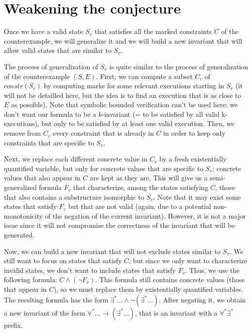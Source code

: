 \documentclass[11pt,a4paper,oldfontcommands,openany]{memoir}
\begin{document}
    \section{Weakening the conjecture}

    Once we have a valid state \(S_v\) that satisfies all the marked constraints \(C\) of the counterexample,
    we will generalize it and we will build a new invariant that will allow valid states that are similar to \(S_v\).

    The process of generalization of \(S_v\) is quite similar to the process of generalization of the counterexample \((S,E)\).
    First, we can compute a subset \(C_v\) of \(constr(S_v)\) by computing marks for some relevant executions starting in \(S_v\)
    (it will not be detailled here, but the idea is to find an execution that is as close to \(E\) as possible).
    Note that symbolic bounded verification can't be used here: we don't want our formula to be a \(k\)-invariant (= to be satisfied by all valid k-executions),
    but only to be satisfied by at least one valid execution.
    Then, we remove from \(C_v\) every constraint that is already in \(C\) in order to keep only constraints that are specific to \(S_v\).

    Next, we replace each different concrete value in \(C_v\) by a fresh existentially quantified variable, but only for concrete values that are specific to \(S_v\):
    concrete values that also appear in \(C\) are kept as they are.
    This will give us a semi-generalized formula \(F_v\) that characterize, among the states satisfying \(C\), those that also
    contains a substructure isomorphic to \(S_v\). Note that it may exist some states that satisfy \(F_v\) but that are not
    valid (again, due to a potential non-monotonicity of the negation of the current invariant).
    However, it is not a major issue since it will not compromise the correctness of the invariant that will be generated.

    Now, we can build a new invariant that will not exclude states similar to \(S_v\).
    We still want to focus on states that satisfy \(C\), but since we only want to characterize invalid states, we don't want to include states that satisfy \(F_v\).
    Thus, we use the following formula: \( C \land (\neg F_v) \).
    This formula still contains concrete values (those that appear in \(C\)), so we must replace them by existentially quantified variables.
    The resulting formula has the form \( \exists^* \ldots \land \neg(\exists^* \ldots) \). After negating it, we obtain a new invariant of the form
    \( \forall^* \ldots \rightarrow (\exists^* \ldots) \), that is an invariant with a \(\forall^*\exists^*\) prefix.
\end{document}
